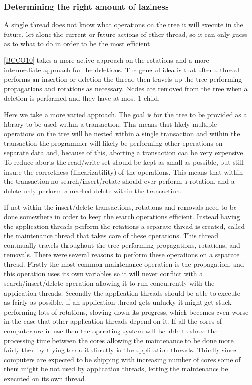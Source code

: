 \documentclass[10pt]{sigplanconf}
\begin{document}
\subsubsection{Determining the right amount of laziness}
A single thread does not know what operations on the tree it will execute in the future, let alone the current or future actions of other thread,
so it can only guess as to what to do in order to be the most efficient.

\ref{BCCO10} takes a more active approach on the rotations and a more intermediate approach for the deletions.
The general idea is that after a thread performs an insertion or deletion the thread then travels up the tree performing propagations and rotations
as necessary.
Nodes are removed from the tree when a deletion is performed and they have at most $1$ child.

Here we take a more varied approach.
The goal is for the tree to be provided as a library to be used within a transaction.
This means that likely multiple operations on the tree will be nested within a single transaction and within the transaction
the programmer will likely be performing other operations on separate data and, because of this, aborting a transaction can be very expensive.
To reduce aborts the read/write set should be kept as small as possible, but still insure the correctness (linearizability) of the operations.
This means that within the transaction no search/insert/rotate should ever perform a rotation, and a delete only perform a marked
delete within the transaction.

If not within the insert/delete transactions, rotations and removals need to be done somewhere in order to keep the search operations efficient.
Instead having the application threads perform the rotations a separate thread is created, called the maintenance thread that takes care of these operations.
This thread continually travels throughout the tree performing propagations, rotations, and removals.
There were several reasons to perform these operations on a separate thread.
Firstly the most common maintenance operation is the propagation, and this operation uses its own variables so it
will never conflict with a search/insert/delete operation allowing it to run concurrently with the application threads.
Secondly the application threads should be able to execute as fairly as possible.
If an application thread gets unlucky it might get stuck performing lots of rotations, slowing down its progress, which becomes even worse in the
case that other application threads depend on it.
If all the cores of computer are in use then the operating system will be able to share the processing time between the cores allowing the maintenance to be done
more fairly then by trying to do it directly in the application threads.
Thirdly since computers are expected to be shipping with increasing number of cores some of them might be not used by application threads, letting the
maintenance be executed on its own thread.
\end{document}
